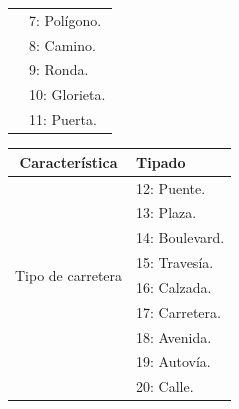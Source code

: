 \begin{enumerate}
\begin{table}[H]
\begin{minipage}{0.4\textwidth}
\begin{tabular}{|c|l|}
                                                                        & 7: Polígono.\\
                                                                        & 8: Camino.\\
                                                                        & 9: Ronda.\\
                                                                        & 10: Glorieta.\\
                                                                        & 11: Puerta.\\

                                \hline
                            \end{tabular}
                        \end{minipage} \hspace{20mm}
                        \begin{minipage}{0.4\textwidth}
                            \begin{tabular}{|c|l|}
                                \hline
                                \textbf{Característica} & \textbf{Tipado}\\
                                \hline
                                \multirow{8}{*}{Tipo de carretera}     
                                                                        & 12: Puente.\\
                                                                        & 13: Plaza.\\
                                                                        & 14: Boulevard.\\
                                                                        & 15: Travesía.\\
                                                                        & 16: Calzada.\\
                                                                        & 17: Carretera.\\
                                                                        & 18: Avenida.\\
                                                                        & 19: Autovía.\\
                                                                        & 20: Calle.\\
                                \hline


\end{tabular}
\end{minipage}
\end{table}
\end{enumerate}
